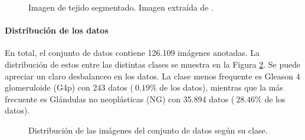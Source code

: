 \begin{figure}[h]
\noindent
{}
\caption{Imagen de tejido segmentado. Imagen extraída de \cite{datosObtencion}.}
\label{fig:datoSegmentado}
\end{figure}

\paragraph*{Distribución de los datos}

En total, el conjunto de datos contiene 126.109 imágenes anotadas. La distribución de estos entre las distintas clases se muestra en la Figura \ref{fig:distribucionDatos}. Se puede apreciar un claro desbalanceo en los datos. La clase menos frequente es Gleason 4 glomeruloide (G4p) con 243 datos ($~0.19\%$ de los datos), mientras que la más frecuente es Glándulas no neoplásticas (NG) con 35.894 datos ($~28.46\%$ de los datos). 


\begin{figure}[h]
\noindent
{}
\caption{Distribución de las imágenes del conjunto de datos según su clase.}
\label{fig:distribucionDatos}
\end{figure}


